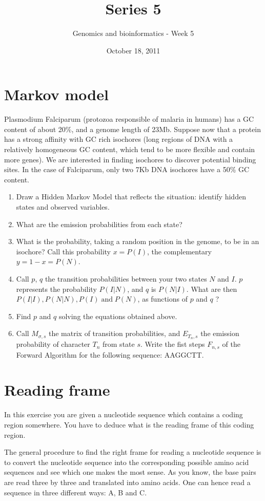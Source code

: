 \documentclass[a4paper,11pt]{article}
\title{Series 5}
\date{October 18, 2011}
\author{Genomics and bioinformatics - Week 5}
\begin{document}
\maketitle

\section{Markov model}
Plasmodium Falciparum (protozoa responsible of malaria in humans) has a GC content of about 20\%, and a genome length of 23Mb. Suppose now that a protein has a strong affinity with GC rich isochores (long regions of DNA with a relatively homogeneous GC content, which tend to be more flexible and contain more genes). We are interested in finding isochores to discover potential binding sites. In the case of Falciparum, only two 7Kb DNA isochores have a 50\% GC content. 
\begin{enumerate}
\item Draw a Hidden Markov Model that reflects the situation: identify hidden states and observed variables.
\item What are the emission probabilities from each state?
\item What is the probability, taking a random position in the genome, to be in an isochore? Call this probability $x = P(I)$, the complementary $y = 1-x = P(N)$.
\item Call $p$, $q$ the transition probabilities between your two states $N$ and $I$. $p$ represents the probability $P(I|N)$, and $q$ is $P(N|I)$. What are then $P(I|I), P(N|N), P(I) \;\text{and}\; P(N)$, as functions of $p$ and $q$ ?
\item Find $p$ and $q$ solving the equations obtained above.
\item Call $M_{\sigma,s}$ the matrix of transition probabilities, and $E_{T_n,s}$ the emission probability of character $T_n$ from state $s$. Write the fist steps $F_{n,s}$ of the Forward Algorithm for the following sequence: AAGGCTT.
\end{enumerate}

\section{Reading frame}
In this exercise you are given a nucleotide sequence which contains a coding region somewhere. You have to deduce what is the reading frame of this coding region.

The general procedure to find the right frame for reading a nucleotide sequence is to convert the nucleotide sequence into the corresponding possible amino acid sequences and see which one makes the most sense. As you know, the base pairs are read three by three and translated into amino acids. One can hence read a sequence in three different ways: A, B and C.
\end{document}
